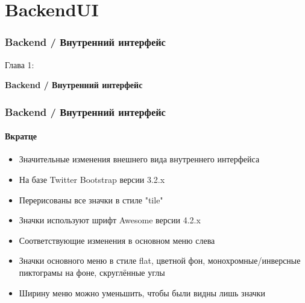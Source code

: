 %

\section{BackendUI}
\begin{frame}[fragile]
	\frametitle{Backend / Внутренний интерфейс}

	\begin{center}\huge{Глава 1:}\end{center}
	\begin{center}\huge{\color{typo3darkgrey}\textbf{Backend / Внутренний интерфейс}}\end{center}

\end{frame}


\begin{frame}[fragile]
	\frametitle{Backend / Внутренний интерфейс}
	\framesubtitle{Вкратце}

	\begin{itemize}
		\item Значительные изменения внешнего вида внутреннего интерфейса
		\item На базе Twitter Bootstrap версии 3.2.x
		\item Перерисованы все значки в стиле "tile"
		\item Значки используют шрифт Awesome версии 4.2.x
		\item Соответствующие изменения в основном меню слева
		\item Значки основного меню в стиле flat, цветной фон, монохромные/инверсные пиктограмы на фоне, скруглённые углы
		\item Ширину меню можно уменьшить, чтобы были видны лишь значки

	\end{itemize}

\end{frame}

